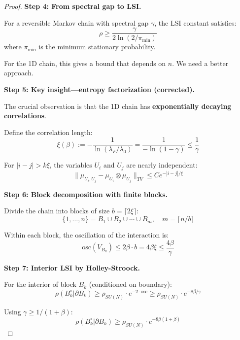 \begin{proof}
\textbf{Step 4: From spectral gap to LSI.}

For a reversible Markov chain with spectral gap $\gamma$, the LSI constant satisfies:
\begin{equation}
\rho \geq \frac{\gamma}{2\ln(2/\pi_{\min})}
\end{equation}
where $\pi_{\min}$ is the minimum stationary probability.

For the 1D chain, this gives a bound that depends on $n$. We need a better approach.

\textbf{Step 5: Key insight—entropy factorization (corrected).}

The crucial observation is that the 1D chain has \textbf{exponentially decaying correlations}.

Define the correlation length:
\begin{equation}
\xi(\beta) := -\frac{1}{\ln(\lambda_F/\lambda_0)} = \frac{1}{-\ln(1-\gamma)} \leq \frac{1}{\gamma}
\end{equation}

For $|i - j| > k\xi$, the variables $U_i$ and $U_j$ are nearly independent:
\begin{equation}
\|\mu_{U_i, U_j} - \mu_{U_i} \otimes \mu_{U_j}\|_{TV} \leq C e^{-|i-j|/\xi}
\end{equation}

\textbf{Step 6: Block decomposition with finite blocks.}

Divide the chain into blocks of size $b = \lceil 2\xi \rceil$:
\begin{equation}
\{1, \ldots, n\} = B_1 \cup B_2 \cup \cdots \cup B_m, \quad m = \lceil n/b \rceil
\end{equation}

Within each block, the oscillation of the interaction is:
\begin{equation}
\text{osc}(V_{B_k}) \leq 2\beta \cdot b = 4\beta\xi \leq \frac{4\beta}{\gamma}
\end{equation}

\textbf{Step 7: Interior LSI by Holley-Stroock.}

For the interior of block $B_k$ (conditioned on boundary):
\begin{equation}
\rho(B_k^\circ | \partial B_k) \geq \rho_{SU(N)} \cdot e^{-2 \cdot \text{osc}} 
\geq \rho_{SU(N)} \cdot e^{-8\beta/\gamma}
\end{equation}

Using $\gamma \geq 1/(1+\beta)$:
\begin{equation}
\rho(B_k^\circ | \partial B_k) \geq \rho_{SU(N)} \cdot e^{-8\beta(1+\beta)}
\end{equation}


\end{proof}
